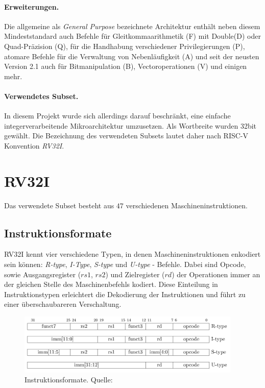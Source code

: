 \paragraph{Erweiterungen.} Die allgemeine als \textit{General Purpose} bezeichnete Architektur enthält neben diesem Mindeststandard auch Befehle für Gleitkommaarithmetik (F) mit Double(D) oder Quad-Präzision (Q), für die Handhabung verschiedener Privilegierungen (P), atomare Befehle für die Verwaltung von Nebenläufigkeit (A) und seit der neusten Version 2.1 auch für Bitmanipulation (B), Vectoroperationen (V) und einigen mehr. \cite[p. 4f.]{RISC}

\paragraph{Verwendetes Subset.} In diesem Projekt wurde sich allerdings darauf beschränkt, eine einfache integerverarbeitende Mikroarchitektur umzusetzen. Als Wortbreite wurden 32bit gewählt. Die Bezeichnung des verwendeten Subsets lautet daher nach RISC-V Konvention \textit{RV32I}. \cite[p. 67ff.]{RISC}

\section{RV32I}
Das verwendete Subset besteht aus $47$ verschiedenen Maschineninstruktionen.

\subsection{Instruktionsformate}
RV32I kennt vier verschiedene Typen, in denen Maschineninstruktionen enkodiert sein können: \textit{R-type}, \textit{I-Type}, \textit{S-type} und \textit{U-type} - Befehle. Dabei sind Opcode, sowie Ausgangsregister ($rs1$, $rs2$) und Zielregister ($rd$) der Operationen immer an der gleichen Stelle des Maschinenbefehls kodiert. Diese Einteilung in Instruktionstypen erleichtert die Dekodierung der Instruktionen und führt zu einer überschaubareren Verschaltung.

\begin{figure} [ht]
  \centering
  \includegraphics[width=0.95\textwidth]{Figures/instruction_formats}
  \caption{Instruktionsformate. Quelle: \citep[S. 11]{RISC}}
  \label{fig:instr_types}
\end{figure}


